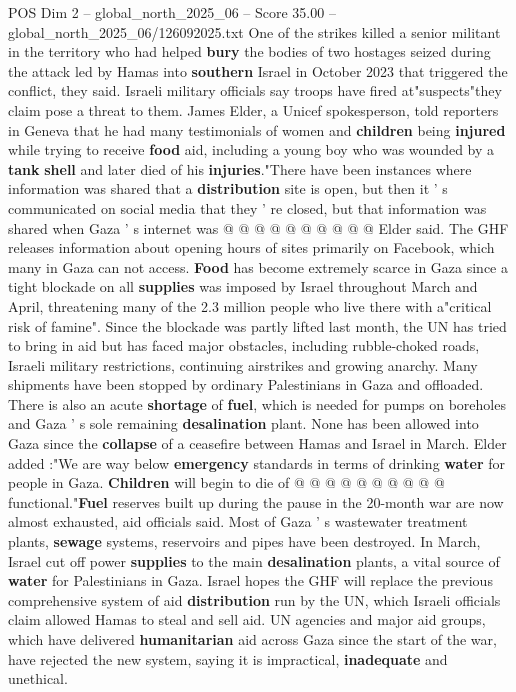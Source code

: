 \begin{textsample}{POS Dim 2 – global\_north\_2025\_06 – Score 35.00 – global\_north\_2025\_06/126092025.txt}
One of the strikes killed a senior militant in the territory who had helped \textbf{bury} the bodies of two hostages seized during the attack led by Hamas into \textbf{southern} Israel in October 2023 that triggered the conflict, they said.
Israeli military officials say troops have fired at"suspects"they claim pose a threat to them.
James Elder, a Unicef spokesperson, told reporters in Geneva that he had many testimonials of women and \textbf{children} being \textbf{injured} while trying to receive \textbf{food} aid, including a young boy who was wounded by a \textbf{tank} \textbf{shell} and later died of his \textbf{injuries}."There have been instances where information was shared that a \textbf{distribution} site is open, but then it ' s communicated on social media that they ' re closed, but that information was shared when Gaza ' s internet was @ @ @ @ @ @ @ @ @ @ Elder said.
The GHF releases information about opening hours of sites primarily on Facebook, which many in Gaza can not access. \textbf{Food} has become extremely scarce in Gaza since a tight blockade on all \textbf{supplies} was imposed by Israel throughout March and April, threatening many of the 2.3 million people who live there with a"critical risk of famine".
Since the blockade was partly lifted last month, the UN has tried to bring in aid but has faced major obstacles, including rubble-choked roads, Israeli military restrictions, continuing airstrikes and growing anarchy.
Many shipments have been stopped by ordinary Palestinians in Gaza and offloaded.
There is also an acute \textbf{shortage} of \textbf{fuel}, which is needed for pumps on boreholes and Gaza ' s sole remaining \textbf{desalination} plant.
None has been allowed into Gaza since the \textbf{collapse} of a ceasefire between Hamas and Israel in March.
Elder added :"We are way below \textbf{emergency} standards in terms of drinking \textbf{water} for people in Gaza. \textbf{Children} will begin to die of @ @ @ @ @ @ @ @ @ @ functional."\textbf{Fuel} reserves built up during the pause in the 20-month war are now almost exhausted, aid officials said.
Most of Gaza ' s wastewater treatment plants, \textbf{sewage} systems, reservoirs and pipes have been destroyed.
In March, Israel cut off power \textbf{supplies} to the main \textbf{desalination} plants, a vital source of \textbf{water} for Palestinians in Gaza.
Israel hopes the GHF will replace the previous comprehensive system of aid \textbf{distribution} run by the UN, which Israeli officials claim allowed Hamas to steal and sell aid.
UN agencies and major aid groups, which have delivered \textbf{humanitarian} aid across Gaza since the start of the war, have rejected the new system, saying it is impractical, \textbf{inadequate} and unethical.

\end{textsample}
